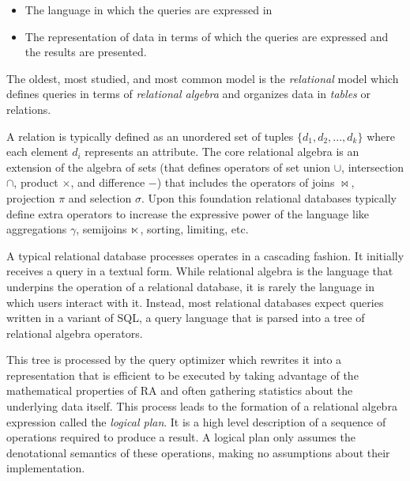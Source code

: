 \begin{itemize}
\item The language in which the queries are expressed in
\item The representation of data in terms of which the queries are
  expressed and the results are presented.
\end{itemize}

The oldest, most studied, and most common model is the \emph{relational} model
which defines queries in terms of \emph{relational algebra} and organizes
data in \emph{tables} or relations.

A relation is typically defined as an unordered set of tuples
\(\{d_1,d_2,...,d_k\}\) where each element \(d_i\) represents an
attribute. The core relational algebra is an extension of the algebra
of sets (that defines operators of set union \(\cup\), intersection
\(\cap\), product \(\times\), and difference \(-\)) that includes the
operators of joins \(\Join\), projection \(\pi\) and selection
\(\sigma\). Upon this foundation relational databases typically define
extra operators to increase the expressive power of the language like
aggregations \(\gamma\), semijoins \(\ltimes\), sorting, limiting, etc.

A typical relational database processes operates in a cascading
fashion. It initially receives a query in a textual form. While
relational algebra is the language that underpins the operation of a
relational database, it is rarely the language in which users interact
with it. Instead, most relational databases expect queries written in a
variant of SQL, a query language that is parsed into a tree of
relational algebra operators.

This tree is processed by the query optimizer which rewrites it into a
representation that is efficient to be executed by taking advantage
of the mathematical properties of RA and often gathering statistics
about the underlying data itself. This process leads to the formation
of a relational algebra expression called the \emph{logical plan}. It
is a high level description of a sequence of operations required to
produce a result. A logical plan only assumes the denotational
semantics of these operations, making no assumptions about their
implementation.

